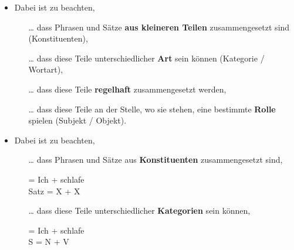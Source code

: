 \begin{frame}

\begin{itemize}

	\item Dabei ist zu beachten,
	
	\begin{itemize}
		\item[\dots] dass Phrasen und Sätze \textbf{aus kleineren Teilen} zusammengesetzt sind (Konstituenten),
		\item[]
		\item [\dots] dass diese Teile unterschiedlicher \textbf{Art} sein können (Kategorie / Wortart),
		\item[]
		\item [\dots] dass diese Teile \textbf{regelhaft} zusammengesetzt werden,
		\item[]
		\item[\dots] dass diese Teile an der Stelle, wo sie stehen, eine bestimmte \textbf{Rolle} spielen (Subjekt / Objekt).
 		
	\end{itemize}
	
\end{itemize}

\end{frame}


\begin{frame}

\begin{itemize}
\item Dabei ist zu beachten, 

\begin{itemize}
	\item [\dots] dass Phrasen und Sätze aus \textbf{Konstituenten} zusammengesetzt sind,

	\ea
	 = Ich + schlafe\\
	Satz = X + X \\
	\z

\pause

	\item [\dots] dass diese Teile unterschiedlicher \textbf{Kategorien} sein können,

	\ea 
	 = Ich + schlafe\\
	S = N + V \\
	\z

\end{itemize}

\end{itemize}

\end{frame}


